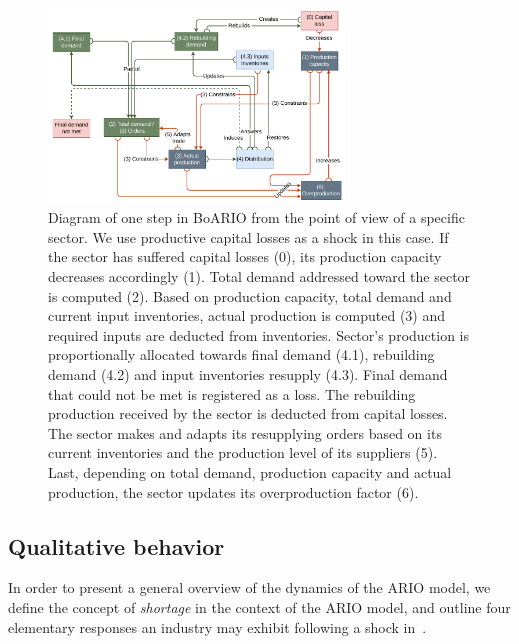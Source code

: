 \begin{figure}[h]
  \centering
  \includegraphics[width=0.70\textwidth]{imgs/BoARIO-diagram-10.pdf}
  \caption[BoARIO process diagram]{\small Diagram of one step in BoARIO
    from the point of view of a specific sector. We use productive capital
    losses as a shock in this case. If the sector has suffered capital
    losses (0), its production capacity decreases accordingly (1). Total demand
    addressed toward the sector is computed (2). Based on production capacity,
    total demand and current input inventories, actual production is computed
    (3) and required inputs are deducted from inventories. Sector's production
    is proportionally allocated towards final demand (4.1), rebuilding demand
    (4.2) and input
    inventories resupply (4.3). Final demand that could not be met
    is registered as a loss. The rebuilding production received by the sector
    is deducted from capital losses. The sector makes and adapts its
    resupplying orders based on its current inventories and the production level
    of its suppliers (5). Last, depending on total demand, production capacity
    and actual production, the sector updates its overproduction factor (6).}
  \label{fig:boario_sketch_1}
\end{figure}


\subsection{Qualitative behavior}
\label{sec:qualitative-behavior}

In order to present a general overview of the dynamics of the ARIO model,
we define the concept of \emph{shortage} in the context of the ARIO model, and
outline four elementary responses an industry may exhibit following a shock in~.


